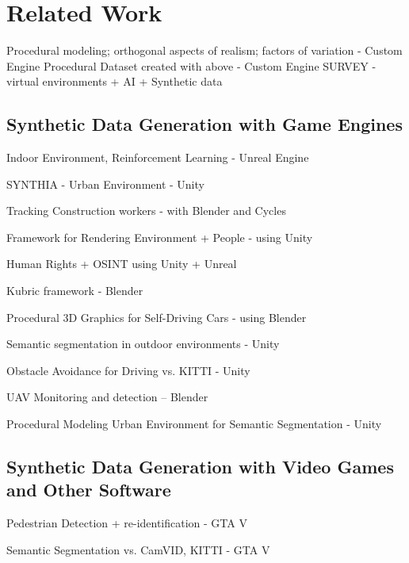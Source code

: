 \chapter{Related Work}
\label{chapter:related}


Procedural modeling; orthogonal aspects of realism; factors of variation - Custom Engine \cite{tsirikoglou2017procedural}
Procedural Dataset created with above - Custom Engine \cite{wrenninge2018synscapes}
SURVEY - virtual environments + AI + Synthetic data \cite{korakakis2018short}


\section{Synthetic Data Generation with Game Engines}
\label{sec:graphics-engines}

Indoor Environment, Reinforcement Learning - Unreal Engine \cite{martinez2021unrealrox+}

SYNTHIA - Urban Environment - Unity \cite{ros2016synthia}

Tracking Construction workers - with Blender and Cycles \cite{neuhausen2020using}

Framework for Rendering Environment + People - using Unity \cite{kerim2021nova}

Human Rights + OSINT using Unity + Unreal \cite{kermode2020objects}

Kubric framework - Blender \cite{greff2021kubric}

Procedural 3D Graphics for Self-Driving Cars - using Blender \cite{bhandari2018procedural}

Semantic segmentation in outdoor environments - Unity \cite{stein2018genesis}

Obstacle Avoidance for Driving vs. KITTI - Unity \cite{pouyanfar2019roads}

UAV Monitoring and detection -- Blender \cite{barisic2022sim2air}

Procedural Modeling Urban Environment for Semantic Segmentation - Unity \cite{khan2019procsy}

\section{Synthetic Data Generation with Video Games and Other Software}
\label{sec:video-games}

Pedestrian Detection + re-identification - GTA V \cite{Fabbri_2021_ICCV}

Semantic Segmentation vs. CamVID, KITTI - GTA V \cite{richter2016playing}

